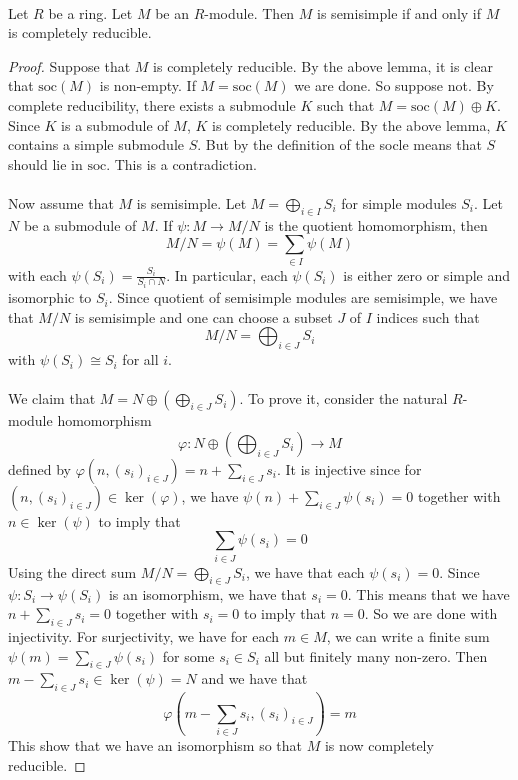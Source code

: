 \documentclass[a4paper]{article}
\begin{document}
\begin{prp}{}{}\\
Let $R$ be a ring. Let $M$ be an $R$-module. Then $M$ is semisimple if and only if $M$ is completely reducible. 
\begin{proof}
Suppose that $M$ is completely reducible. By the above lemma, it is clear that $\text{soc}(M)$ is non-empty. If $M=\text{soc}(M)$ we are done. So suppose not. By complete reducibility, there exists a submodule $K$ such that $M=\text{soc}(M)\oplus K$. Since $K$ is a submodule of $M$, $K$ is completely reducible. By the above lemma, $K$ contains a simple submodule $S$. But by the definition of the socle means that $S$ should lie in $\text{soc}$. This is a contradiction. \\~\\

Now assume that $M$ is semisimple. Let $M=\bigoplus_{i\in I}S_i$ for simple modules $S_i$. Let $N$ be a submodule of $M$. If $\psi:M\to M/N$ is the quotient homomorphism, then $$M/N=\psi(M)=\sum_{\in I}\psi(M)$$ with each $\psi(S_i)=\frac{S_i}{S_i\cap N}$. In particular, each $\psi(S_i)$ is either zero or simple and isomorphic to $S_i$. Since quotient of semisimple modules are semisimple, we have that $M/N$ is semisimple and one can choose a subset $J$ of $I$ indices such that $$M/N=\bigoplus_{i\in J} S_i$$ with $\psi(S_i)\cong S_i$ for all $i$. \\~\\

We claim that $M=N\oplus\left(\bigoplus_{i\in J}S_i\right)$. To prove it, consider the natural $R$-module homomorphism $$\varphi:N\oplus\left(\bigoplus_{i\in J}S_i\right)\to M$$ defined by $\varphi(n,(s_i)_{i\in J})=n+\sum_{i\in J}s_i$. It is injective since for $(n,(s_i)_{i\in J})\in\ker(\varphi)$, we have $\psi(n)+\sum_{i\in J}\psi(s_i)=0$ together with $n\in\ker(\psi)$ to imply that $$\sum_{i\in J}\psi(s_i)=0$$ Using the direct sum $M/N=\bigoplus_{i\in J} S_i$, we have that each $\psi(s_i)=0$. Since $\psi:S_i\to\psi(S_i)$ is an isomorphism, we have that $s_i=0$. This means that we have $n+\sum_{i\in J}s_i=0$ together with $s_i=0$ to imply that $n=0$. So we are done with injectivity. For surjectivity, we have for each $m\in M$, we can write a finite sum $\psi(m)=\sum_{i\in J}\psi(s_i)$ for some $s_i\in S_i$ all but finitely many non-zero. Then $m-\sum_{i\in J}s_i\in\ker(\psi)=N$ and we have that $$\varphi\left(m-\sum_{i\in J}s_i,(s_i)_{i\in J}\right)=m$$ This show that we have an isomorphism so that $M$ is now completely reducible. 
\end{proof}
\end{prp}
\end{document}
